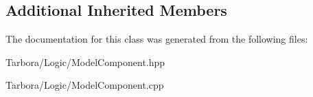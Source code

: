 \subsection*{Additional Inherited Members}


The documentation for this class was generated from the following files\+:\begin{DoxyCompactItemize}
\item 
Tarbora/\+Logic/Model\+Component.\+hpp\item 
Tarbora/\+Logic/Model\+Component.\+cpp\end{DoxyCompactItemize}
